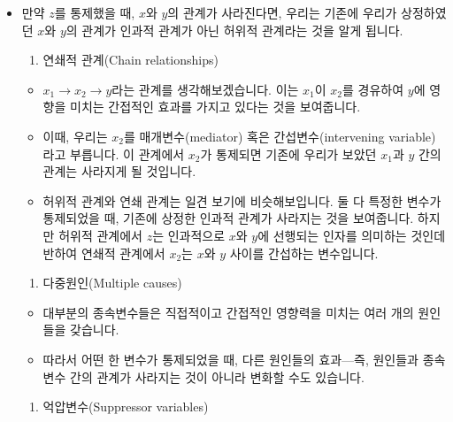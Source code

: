 \documentclass[]{book}
\providecommand{\tightlist}{%
  \setlength{\itemsep}{0pt}\setlength{\parskip}{0pt}}
\begin{document}
\begin{itemize}
\item
  만약 \(z\)를 통제했을 때, \(x\)와 \(y\)의 관계가 사라진다면, 우리는 기존에 우리가 상정하였던 \(x\)와 \(y\)의 관계가 인과적 관계가 아닌 허위적 관계라는 것을 알게 됩니다.

  \begin{enumerate}
  \def\labelenumi{\arabic{enumi}.}
  \setcounter{enumi}{1}
  \tightlist
  \item
    연쇄적 관계(Chain relationships)
  \end{enumerate}

  \begin{itemize}
  \tightlist
  \item
    \(x_1 \rightarrow x_2 \rightarrow y\)라는 관계를 생각해보겠습니다. 이는 \(x_1\)이 \(x_2\)를 경유하여 \(y\)에 영향을 미치는 간접적인 효과를 가지고 있다는 것을 보여줍니다.
  \item
    이때, 우리는 \(x_2\)를 매개변수(mediator) 혹은 간섭변수(intervening variable)라고 부릅니다. 이 관계에서 \(x_2\)가 통제되면 기존에 우리가 보았던 \(x_1\)과 \(y\) 간의 관계는 사라지게 될 것입니다.
  \item
    허위적 관계와 연쇄 관계는 일견 보기에 비슷해보입니다. 둘 다 특정한 변수가 통제되었을 때, 기존에 상정한 인과적 관계가 사라지는 것을 보여줍니다. 하지만 허위적 관계에서 \(z\)는 인과적으로 \(x\)와 \(y\)에 선행되는 인자를 의미하는 것인데 반하여 연쇄적 관계에서 \(x_2\)는 \(x\)와 \(y\) 사이를 간섭하는 변수입니다.
  \end{itemize}

  \begin{enumerate}
  \def\labelenumi{\arabic{enumi}.}
  \setcounter{enumi}{2}
  \tightlist
  \item
    다중원인(Multiple causes)
  \end{enumerate}

  \begin{itemize}
  \tightlist
  \item
    대부분의 종속변수들은 직접적이고 간접적인 영향력을 미치는 여러 개의 원인들을 갖습니다.
  \item
    따라서 어떤 한 변수가 통제되었을 때, 다른 원인들의 효과---즉, 원인들과 종속변수 간의 관계가 사라지는 것이 아니라 변화할 수도 있습니다.
  \end{itemize}

  \begin{enumerate}
  \def\labelenumi{\arabic{enumi}.}
  \setcounter{enumi}{3}
  \tightlist
  \item
    억압변수(Suppressor variables)
  \end{enumerate}


\end{itemize}
\end{document}
